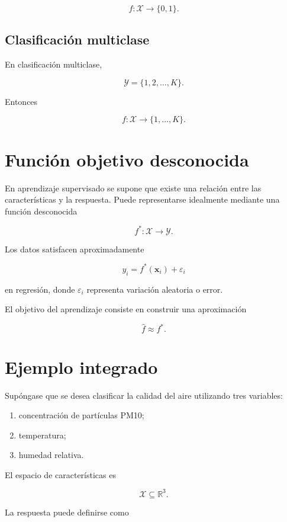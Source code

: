 \documentclass[
  spanish,
  11pt,
  letterpaper,
  DIV=11,
  numbers=noendperiod]{scrreprt}
\providecommand{\tightlist}{%
  \setlength{\itemsep}{0pt}\setlength{\parskip}{0pt}}
\theoremstyle{definition}
\theoremstyle{plain}
\theoremstyle{definition}
\theoremstyle{remark}
\begin{document}
\[
f:\mathcal{X}\to\{0,1\}.
\]

\subsection{Clasificación multiclase}\label{clasificaciuxf3n-multiclase}

En clasificación multiclase,

\[
\mathcal{Y}
=
\{1,2,\ldots,K\}.
\]

Entonces

\[
f:\mathcal{X}\to\{1,\ldots,K\}.
\]

\section{Función objetivo
desconocida}\label{funciuxf3n-objetivo-desconocida}

En aprendizaje supervisado se supone que existe una relación entre las
características y la respuesta. Puede representarse idealmente mediante
una función desconocida

\[
f^{*}:\mathcal{X}\to\mathcal{Y}.
\]

Los datos satisfacen aproximadamente

\[
y_i=f^{*}(\mathbf{x}_i)+\varepsilon_i
\]

en regresión, donde \(\varepsilon_i\) representa variación aleatoria o
error.

El objetivo del aprendizaje consiste en construir una aproximación

\[
\widehat{f}\approx f^{*}.
\]

\section{Ejemplo integrado}\label{ejemplo-integrado}

Supóngase que se desea clasificar la calidad del aire utilizando tres
variables:

\begin{enumerate}
\def\labelenumi{\arabic{enumi}.}
\tightlist
\item
  concentración de partículas PM10;
\item
  temperatura;
\item
  humedad relativa.
\end{enumerate}

El espacio de características es

\[
\mathcal{X}\subseteq\mathbb{R}^{3}.
\]

La respuesta puede definirse como
\end{document}
